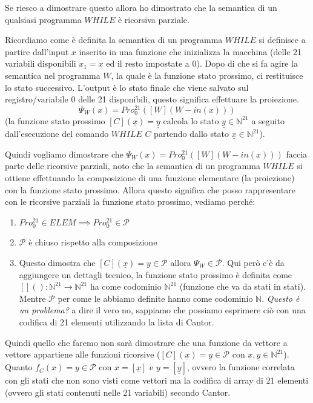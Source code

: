 \documentclass{article}
\begin{document}
Se riesco a dimostrare questo allora ho dimostrato che la semantica di un qualsiasi programma
$WHILE$ è ricorsiva parziale.

Ricordiamo come è definita la semantica di un programma $WHILE$ si definisce a partire
dall'input $x$ inserito in una funzione che inizializza la macchina (delle 21 variabili
disponibili $x_1=x$ ed il resto impostate a 0). Dopo di che si fa agire la semantica nel
programma $W$, la quale è la funzione stato prossimo, ci restituisce lo stato successivo.
L'output è lo stato finale che viene salvato sul registro/variabile 0 delle 21 disponibili,
questo significa effettuare la proiezione.
$$\Psi_W(x)=Pro_0^{21}([W](W-in(x)))$$
(la funzione stato prossimo $[C](\underline{x})=\underline{y}$ calcola lo stato
$\underline{y}\in\mathbb{N}^{21}$ a seguito dall'esecuzione del comando $WHILE$ $C$
partendo dallo stato $\underline{x}\in\mathbb{N}^{21}$).

Quindi vogliamo dimostrare che $\Psi_W(x)=Pro_0^{21}([W](W-in(x)))$ faccia parte delle
ricorsive parziali, noto che la semantica di un programma $WHILE$ si ottiene effettuando
la composizione di una funzione elementare (la proiezione) con la funzione stato prossimo.
Allora questo significa che posso rappresentare con le ricorsive parziali la funzione
stato prossimo, vediamo perché:
\begin{enumerate}
    \item $Pro_0^{21}\in ELEM\implies Pro_0^{21}\in\mathcal{P}$
    \item $\mathcal{P}$ è chiuso rispetto alla composizione
    \item Questo dimostra che $[C](\underline{x})=y\in\mathcal{P}$ allora $\Psi_W\in\mathcal{P}$. Qui
          però c'è da aggiungere un dettagli tecnico, la funzione stato prossimo è definita come $[]():\mathbb{N}^{21}\rightarrow\mathbb{N}^{21}$
          ha come codominio $\mathbb{N}^21$ (funzione che va da stati in stati). Mentre $\mathcal{P}$ per come le abbiamo
          definite hanno come codominio $\mathbb{N}$. \textit{Questo è un problema?} a dire il vero no, sappiamo che possiamo
          esprimere ciò con una codifica di 21 elementi utilizzando la lista di Cantor.
\end{enumerate}
Quindi quello che faremo non sarà dimostrare che una funzione da vettore a vettore appartiene
alle funzioni ricorsive ($[C](\underline{x})=\underline{y}\in\mathcal{P}$ con $\underline{x},\underline{y}\in\mathbb{N}^{21}$).
Quanto $f_C(x)=y\in\mathcal{P}$ con $x=[\underline{x}]$ e $y=[\underline{y}]$, ovvero la funzione
correlata con gli stati che non sono visti come vettori ma la codifica di array di 21 elementi (ovvero
gli stati contenuti nelle 21 variabili) secondo Cantor.
\end{document}
